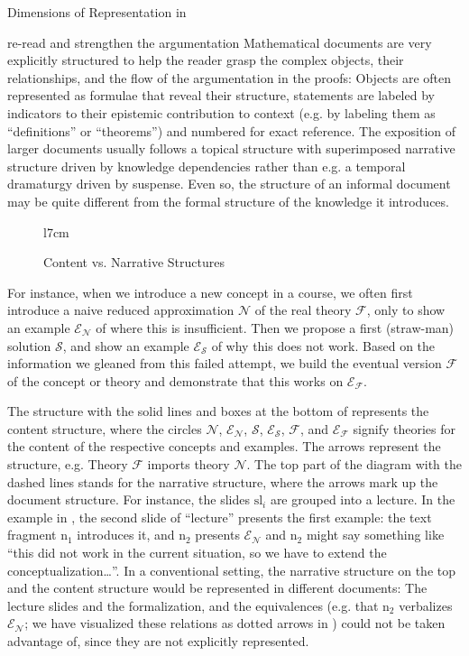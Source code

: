 \begin{omgroup}[id=syntax-semantics]{Dimensions of Representation in \omdoc}
\begin{newpart}{re-read and strengthen the argumentation}
Mathematical documents are very explicitly structured to help the reader grasp the complex
objects, their relationships, and the flow of the argumentation in the proofs: Objects are
often represented as formulae that reveal their structure, statements are labeled by
indicators to their epistemic contribution to context (e.g. by labeling them as
``definitions'' or ``theorems'') and numbered for exact reference. The exposition of
larger documents usually follows a topical structure with superimposed narrative structure
driven by knowledge dependencies rather than e.g. a temporal dramaturgy driven by
suspense.  Even so, the structure of an informal document may be quite different from the
formal structure of the knowledge it introduces.

\begin{figure}l{7cm}\vspace*{-2em}
\caption{Content vs. Narrative Structures}\label{fig:straw-man}
\end{figure}
For instance, when we introduce a new concept in a course, we often first introduce a
naive reduced approximation $\mathcal{N}$ of the real theory $\mathcal{F}$, only to show
an example $\mathcal{E_N}$ of where this is insufficient. Then we propose a first
(straw-man) solution $\mathcal{S}$, and show an example $\mathcal{E_S}$ of why this does
not work. Based on the information we gleaned from this failed attempt, we build the
eventual version $\mathcal{F}$ of the concept or theory and demonstrate that this works on
$\mathcal{E_F}$.
 
The structure with the solid lines and boxes at the bottom of {}
represents the content structure, where the circles $\mathcal{N}$, $\mathcal{E_N}$,
$\mathcal{S}$, $\mathcal{E_S}$, $\mathcal{F}$, and $\mathcal{E_F}$ signify theories for
the content of the respective concepts and examples. The arrows represent the
{} structure, e.g. Theory $\mathcal{F}$ imports theory
$\mathcal{N}$. The top part of the diagram with the dashed lines stands for the narrative
structure, where the arrows mark up the document structure. For instance, the slides
$\text{sl}_i$ are grouped into a lecture. In the example in {}, the
second slide of ``lecture'' presents the first example: the text fragment $\text{n}_1$
introduces it, and $\text{n}_2$ presents $\mathcal{E_N}$ and $\text{n}_2$ might say
something like ``this did not work in the current situation, so we have to extend the
conceptualization\ldots''. In a conventional setting, the narrative structure on the top
and the content structure would be represented in different documents: The lecture slides
and the formalization, and the equivalences (e.g. that $\text{n}_2$ verbalizes
$\mathcal{E_N}$; we have visualized these relations as dotted arrows in
{}) could not be taken advantage of, since they are not explicitly
represented.


\end{newpart}
\end{omgroup}

